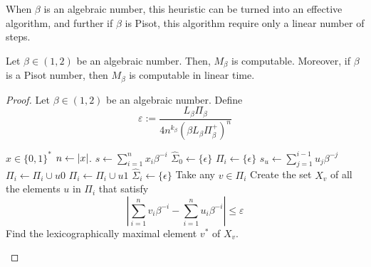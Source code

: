 When $\beta$ is an algebraic number, this heuristic can be turned into an effective algorithm, and further if $\beta$ is Pisot, this algorithm require only a linear number of steps.
\begin{theorem}
    Let $\beta \in (1,2)$ be an algebraic number. Then, $M_\beta$ is computable. Moreover, if $\beta$ is a Pisot number, then $M_\beta$ is computable in linear time.
\end{theorem}
\begin{proof}
    Let $\beta \in (1,2)$ be an algebraic number. Define 
    \begin{equation}
        \varepsilon := \frac{L_\beta\Pi_\beta}{\displaystyle  4n^{k_\beta}\left(\beta L_\beta \Pi_\beta^+ \right)^n}
    \end{equation}
    \begin{algorithm}[t]
        \caption{Fast algorithm for computing $M_\beta$}
        \label{alg:fast algorithm for computing M beta}
        \begin{algorithmic}[1]
            \Require $x \in \{0,1\}^\ast$
            \State $n \gets \left| x \right|$. 
            \State $s \gets \sum_{i=1}^nx_i \beta^{-i}$
            \State $\hat \Sigma_0 \gets \{\epsilon\}$
             \label{line:4:alg:fast algorithm for computing M beta}
                \State $\Pi_i \gets \{\epsilon\}$
                 \label{line:6:alg:fast algorithm for computing M beta}
                    \State $s_u \gets \sum_{j=1}^{i-1}u_j \beta^{-j}$
                        \State $\Pi_i \gets \Pi_i \cup {u0}$
                    \EndIf
                        \State $\Pi_i \gets \Pi_i \cup {u1}$
                    \EndIf
                \EndFor
                \State $\hat \Sigma_i \gets \{\epsilon\}$
                 \label{line:16:alg:fast algorithm for computing M beta}
                    \State Take any $v \in \Pi_i$\label{line:17:alg:fast algorithm for computing M beta}
                    \State Create the set $X_v$ of all the elements $u$ in $\Pi_i$ that satisfy \label{line:18:alg:fast algorithm for computing M beta}
                    \begin{equation}
                        \left| \sum_{i=1}^n v_i \beta^{-i} - \sum_{i=1}^n u_i \beta^{-i}\right| \leq \varepsilon
                    \end{equation}
                    \State Find the lexicographically maximal element $v^\ast$ of $X_v$. \label{line:19:alg:fast algorithm for computing M beta}

\end{algorithmic}
\end{algorithm}
\end{proof}
